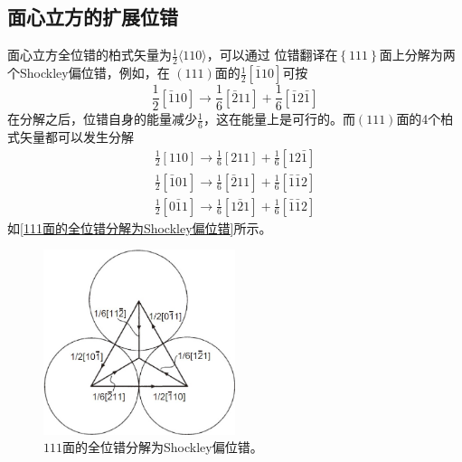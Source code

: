             \subsection{面心立方的扩展位错}
                面心立方全位错的柏式矢量为$\frac{1}{2}\langle 110\rangle$，可以通过
                位错翻译在$\left\{ 111\right\}$面上分解为两个Shockley偏位错，例如，在
                $(111)$面的$\frac{1}{2}[\bar{1}10]$可按
                \begin{equation}
                    \frac{1}{2}[\bar{1}10]\to\frac{1}{6}[\bar{2}11]+\frac{1}{6}[\bar{1}2\bar{1}]
                \end{equation}
                在分解之后，位错自身的能量减少$\frac{1}{6}$，这在能量上是可行的。而$(111)$面的4个柏式矢量都可以发生分解
                \begin{equation}
                    \begin{aligned}
                    \frac{1}{2}[110]\to\frac{1}{6}[211]+\frac{1}{6}[12\bar{1}]\\
                    \frac{1}{2}[\bar{1}01]\to\frac{1}{6}[\bar{2}11]+\frac{1}{6}[\bar{1}\bar{1}2]\\
                    \frac{1}{2}[0\bar{1}1]\to\frac{1}{6}[1\bar{2}1]+\frac{1}{6}[\bar{1}\bar{1}2]
                    \end{aligned}
                \end{equation}
                如\autoref{111面的全位错分解为Shockley偏位错}所示。
                \begin{figure}[ht]
                    \centering
                    \includegraphics[width=0.5\textwidth]{fig/perfect_burgers_vector_to_shockley_partial_vector.jpg}
                    \caption{${111}$面的全位错分解为Shockley偏位错。}
                    \label{111面的全位错分解为Shockley偏位错}
                \end{figure}


